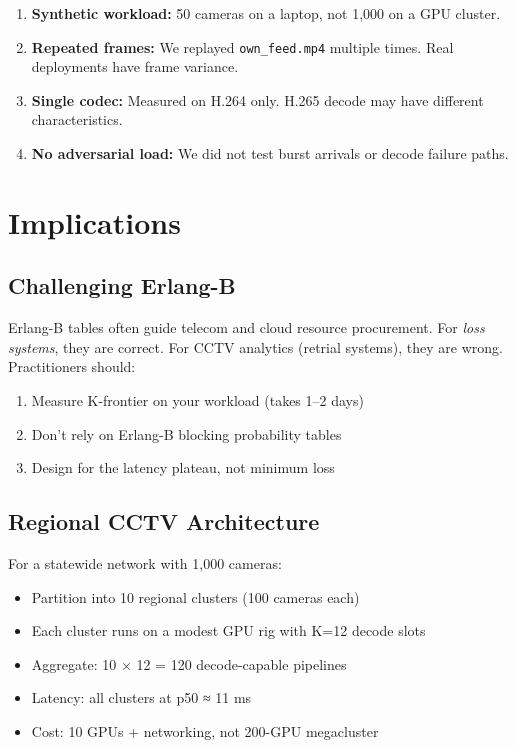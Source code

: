 \documentclass[sigconf,review]{acmart}
\begin{document}
\begin{enumerate}
  \item \textbf{Synthetic workload:} 50 cameras on a laptop, not 1,000 on a GPU cluster.
  \item \textbf{Repeated frames:} We replayed \texttt{own\_feed.mp4} multiple times. Real deployments have frame variance.
  \item \textbf{Single codec:} Measured on H.264 only. H.265 decode may have different characteristics.
  \item \textbf{No adversarial load:} We did not test burst arrivals or decode failure paths.
\end{enumerate}

\section{Implications}

\subsection{Challenging Erlang-B}

Erlang-B tables often guide telecom and cloud resource procurement. For \emph{loss systems}, they are correct.
For CCTV analytics (retrial systems), they are wrong. Practitioners should:
\begin{enumerate}
  \item Measure K-frontier on your workload (takes 1–2 days)
  \item Don't rely on Erlang-B blocking probability tables
  \item Design for the latency plateau, not minimum loss
\end{enumerate}

\subsection{Regional CCTV Architecture}

For a statewide network with 1,000 cameras:
\begin{itemize}
  \item Partition into 10 regional clusters (100 cameras each)
  \item Each cluster runs on a modest GPU rig with K=12 decode slots
  \item Aggregate: 10 × 12 = 120 decode-capable pipelines
  \item Latency: all clusters at p50 ≈ 11 ms
  \item Cost: 10 GPUs + networking, not 200-GPU megacluster
\end{itemize}
\end{document}
